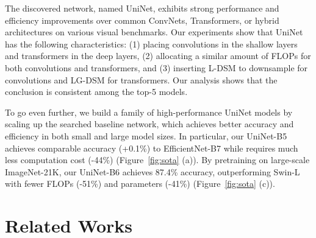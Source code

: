 \documentclass[runningheads]{llncs}
\begin{document}
\begin{table}[t]
\centering
\caption{ImageNet top-1 accuracy of different operator combinations. T, M, and C refer to transformer block, MLP-Mixer block, and Depthwise Convolution block respectively. Different block numbers are chosen so that their computations are comparable.}
\label{pilot_study}
\end{table}

The discovered network, named UniNet, exhibits strong performance and efficiency improvements over common ConvNets, Transformers, or hybrid architectures on various visual benchmarks. Our experiments show that UniNet has the following characteristics: (1) placing convolutions in the shallow layers and transformers in the deep layers, (2) allocating a similar amount of FLOPs for both convolutions and transformers, and (3) inserting L-DSM to downsample for convolutions and LG-DSM for transformers. Our analysis shows that the conclusion is consistent among the top-5 models.

To go even further, we build a family of high-performance UniNet models by scaling up the searched baseline network, which achieves better accuracy and efficiency in both small and large model sizes. In particular, our UniNet-B5 achieves comparable accuracy (+0.1\%) to EfficientNet-B7 while requires much less computation cost (-44\%) (Figure~\ref{fig:sota} (a)). By pretraining on large-scale ImageNet-21K, our UniNet-B6 achieves 87.4\% accuracy, outperforming Swin-L with fewer FLOPs (-51\%) and parameters (-41\%) (Figure~\ref{fig:sota} (c)).






\section{Related Works}
\label{related_works}
\end{document}
